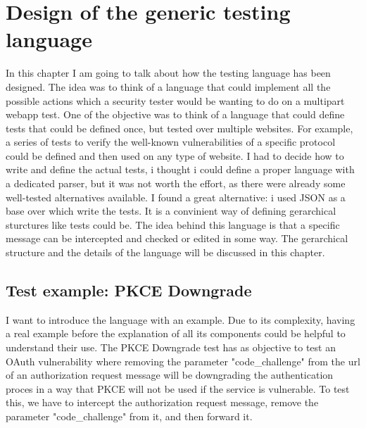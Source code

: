 \chapter{Design of the generic testing language}
In this chapter I am going to talk about how the testing language has been designed. The idea was to think of a language that could implement all the possible actions which a security tester would be wanting to do on a multipart webapp test. One of the objective was to think of a language that could define tests that could be defined once, but tested over multiple websites. For example, a series of tests to verify the well-known vulnerabilities of a specific protocol could be defined and then used on any type of website.
I had to decide how to write and define the actual tests, i thought i could define a proper language with a dedicated parser, but it was not worth the effort, as there were already some well-tested alternatives available. I found a great alternative: i used JSON as a base over which write the tests. It is a convinient way of defining gerarchical sturctures like tests could be.
The idea behind this language is that a specific message can be intercepted and checked or edited in some way.
The gerarchical structure and the details of the language will be discussed in this chapter.

\section{Test example: PKCE Downgrade}
I want to introduce the language with an example. Due to its complexity, having a real example before the explanation of all its components could be helpful to understand their use.
The PKCE Downgrade test has as objective to test an OAuth vulnerability where removing the parameter "code\_challenge" from the url of an authorization request message will be downgrading the authentication proces in a way that PKCE will not be used if the service is vulnerable. To test this, we have to intercept the authorization request message, remove the parameter "code\_challenge" from it, and then forward it.


